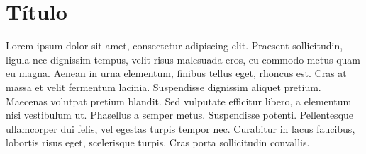 \section{Título}
\label{sec:titulo}

Lorem ipsum dolor sit amet, consectetur adipiscing elit. Praesent sollicitudin, ligula nec dignissim tempus, velit risus malesuada eros, eu commodo metus quam eu magna. Aenean in urna elementum, finibus tellus eget, rhoncus est. Cras at massa et velit fermentum lacinia. Suspendisse dignissim aliquet pretium. Maecenas volutpat pretium blandit. Sed vulputate efficitur libero, a elementum nisi vestibulum ut. Phasellus a semper metus. Suspendisse potenti. Pellentesque ullamcorper dui felis, vel egestas turpis tempor nec. Curabitur in lacus faucibus, lobortis risus eget, scelerisque turpis. Cras porta sollicitudin convallis.
